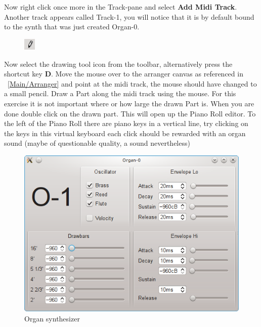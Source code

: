 \documentclass[a4paper]{report}
\newcommand{\key}[1]{\textbf{#1}}
\newcommand{\menu}[1]{\textbf{#1}}
\begin{document}
Now right click once more in the Track-pane and select \menu{Add Midi
Track}. Another track appears called Track-1, you will notice that it is
by default bound to the synth that was just created Organ-0.
\begin{figure}
\includegraphics[width=0.05\textwidth]{pics/arrow_tool}
\end{figure}
Now select the drawing tool icon
from the toolbar, alternatively press the shortcut key \key{D}.
Move the mouse over to the arranger canvas as referenced in ~\ref{Main/Arranger}
and point at the midi track, the mouse should have changed to a small pencil.
Draw a Part along the midi track using the mouse. For this exercise it is
not important where or how large the drawn Part is. When you are done double
click on the drawn part. This will open up the Piano Roll editor. To the
left of the Piano Roll there are piano keys in a vertical line, try clicking
on the keys in this virtual keyboard each click should be rewarded with an
organ sound (maybe of questionable quality, a sound nevertheless)
\begin{figure}[htp]
\centering
\includegraphics[width=.5\textwidth]{pics/organ_synth}
\caption{Organ synthesizer}
\label{fig:organ_synth}
\end{figure}
\end{document}
